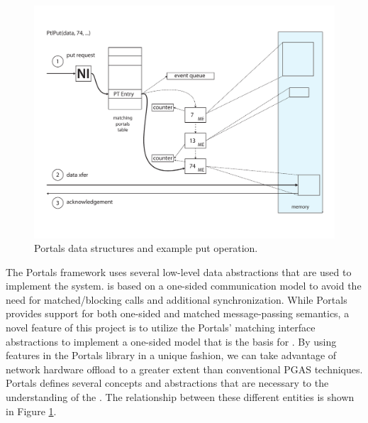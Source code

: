 



\begin{figure}[ht]
  \centering
  \includegraphics[scale=.30]{figs/portals_put}
  \caption{Portals data structures and example put operation.}
  \label{fig:portals_put}
\end{figure}

The Portals framework uses several low-level data abstractions that
are used to implement the \pdht system. \pdht is based on a one-sided
communication model to avoid the need for matched/blocking calls and
additional synchronization. While Portals provides support for both
one-sided and matched message-passing semantics, a novel feature of
this project is to utilize the Portals' matching interface
abstractions to implement a one-sided model that is the basis for
\pdht. By using features in the Portals library in a unique fashion,
we can take advantage of network hardware offload  to a greater extent
than conventional PGAS techniques. Portals defines several concepts
and abstractions that are necessary to the understanding of the
\pdht. The relationship between these different entities is shown in
Figure \ref{fig:portals_put}.

